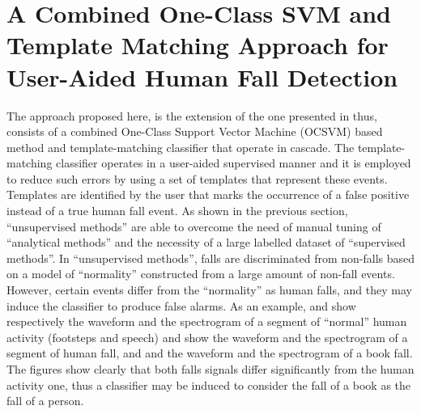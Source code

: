 \section[A Combined OCSVM and Template Matching User-Aided Approach]{A Combined One-Class SVM and Template Matching Approach for User-Aided Human Fall Detection}
\label{sec:user_aided_cin}

The approach proposed here, is the extension of the one presented in  thus, consists of a combined One-Class Support Vector Machine (OCSVM) based method and template-matching classifier that operate in cascade. The template-matching classifier operates in a user-aided supervised manner and it is employed to reduce such errors by using a set of templates that represent these events. Templates are identified by the user that marks the occurrence of a false positive instead of a true human fall event. 
As shown in the previous section, ``unsupervised methods'' are able to overcome the need of manual tuning of ``analytical methods'' and the necessity of a large labelled dataset of ``supervised methods''. In ``unsupervised methods'', falls are discriminated from non-falls based on a model of ``normality'' constructed from a large amount of non-fall events. However, certain events differ from the ``normality'' as human falls, and they may induce the classifier to produce false alarms. As an example,  and  show respectively the waveform and the spectrogram of a segment of ``normal'' human activity (footsteps and speech)  and  show the waveform and the spectrogram of a segment of human fall, and  and  the waveform and the spectrogram of a book fall. The figures show clearly that both falls signals differ significantly from the human activity one, thus a classifier may be induced to consider the fall of a book as the fall of a person.

